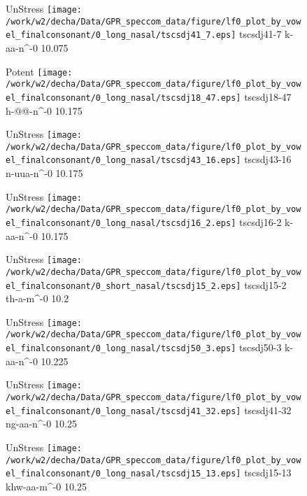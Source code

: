 \documentclass{article}
\begin{document}
\begin{figure}[t]
\begin{minipage}[b]{.24\textwidth}
UnStress
\centering
\texttt{[image: /work/w2/decha/Data/GPR\_speccom\_data/figure/lf0\_plot\_by\_vowel\_finalconsonant/0\_long\_nasal/tscsdj41\_7.eps]}
tscsdj41-7 k-aa-n\textasciicircum-0 10.075
\end{minipage}
\begin{minipage}[b]{.24\textwidth}
\colorbox{Apricot}{Potent}
\centering
\texttt{[image: /work/w2/decha/Data/GPR\_speccom\_data/figure/lf0\_plot\_by\_vowel\_finalconsonant/0\_long\_nasal/tscsdj18\_47.eps]}
tscsdj18-47 h-@@-n\textasciicircum-0 10.175
\end{minipage}
\begin{minipage}[b]{.24\textwidth}
UnStress
\centering
\texttt{[image: /work/w2/decha/Data/GPR\_speccom\_data/figure/lf0\_plot\_by\_vowel\_finalconsonant/0\_long\_nasal/tscsdj43\_16.eps]}
tscsdj43-16 n-uua-n\textasciicircum-0 10.175
\end{minipage}
\begin{minipage}[b]{.24\textwidth}
UnStress
\centering
\texttt{[image: /work/w2/decha/Data/GPR\_speccom\_data/figure/lf0\_plot\_by\_vowel\_finalconsonant/0\_long\_nasal/tscsdj16\_2.eps]}
tscsdj16-2 k-aa-n\textasciicircum-0 10.175
\end{minipage}
\end{figure}

\begin{figure}[t]
\begin{minipage}[b]{.24\textwidth}
UnStress
\centering
\texttt{[image: /work/w2/decha/Data/GPR\_speccom\_data/figure/lf0\_plot\_by\_vowel\_finalconsonant/0\_short\_nasal/tscsdj15\_2.eps]}
tscsdj15-2 th-a-m\textasciicircum-0 10.2
\end{minipage}
\begin{minipage}[b]{.24\textwidth}
UnStress
\centering
\texttt{[image: /work/w2/decha/Data/GPR\_speccom\_data/figure/lf0\_plot\_by\_vowel\_finalconsonant/0\_long\_nasal/tscsdj50\_3.eps]}
tscsdj50-3 k-aa-n\textasciicircum-0 10.225
\end{minipage}
\begin{minipage}[b]{.24\textwidth}
UnStress
\centering
\texttt{[image: /work/w2/decha/Data/GPR\_speccom\_data/figure/lf0\_plot\_by\_vowel\_finalconsonant/0\_long\_nasal/tscsdj41\_32.eps]}
tscsdj41-32 ng-aa-n\textasciicircum-0 10.25
\end{minipage}
\begin{minipage}[b]{.24\textwidth}
UnStress
\centering
\texttt{[image: /work/w2/decha/Data/GPR\_speccom\_data/figure/lf0\_plot\_by\_vowel\_finalconsonant/0\_long\_nasal/tscsdj15\_13.eps]}
tscsdj15-13 khw-aa-m\textasciicircum-0 10.25
\end{minipage}
\end{figure}
\end{document}

